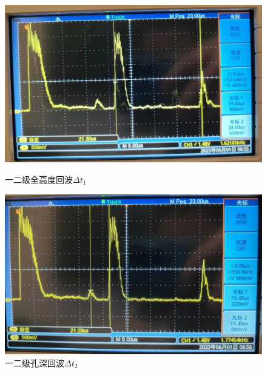 \documentclass[UTF8,a4paper]{article}%
\begin{document}
\begin{figure}[H] %
    \centering
    \begin{minipage}[t]{0.5\linewidth}
        \centering
        \includegraphics[width=0.95\linewidth]{B1-1.jpg}
        \caption{一二级全高度回波$\Delta t_1$}
        \label{fg:b1-1}
    \end{minipage}%
    \begin{minipage}[t]{0.5\linewidth}
        \centering
        \includegraphics[width=0.95\linewidth]{B1-2.jpg}
        \caption{一二级孔深回波$\Delta t_2$}
        \label{fg:b1-2}
    \end{minipage}
\end{figure}
\end{document}

